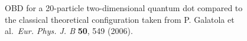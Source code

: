 \begin{frame}
 \begin{figure}
 \begin{center}
  \label{fig:wigner20}
  \caption{OBD for a 20-particle two-dimensional quantum dot compared to the classical theoretical configuration taken from P. Galatola et al.~\textit{Eur. Phys. J. B} \textbf{50}, 549 (2006).}
 \end{center}
\end{figure}
\end{frame}

